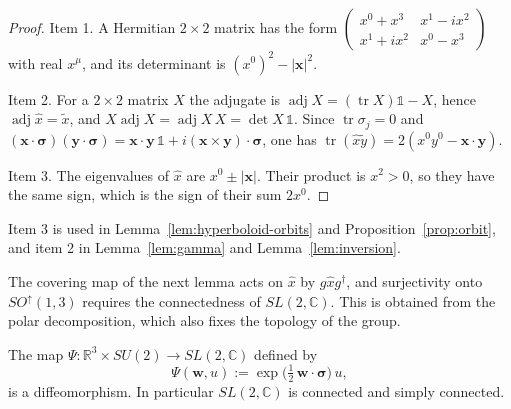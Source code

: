 \begin{proof}
	Item 1. A Hermitian $2\times2$ matrix has the form $\begin{pmatrix}x^0+x^3&x^1-ix^2\\x^1+ix^2&x^0-x^3\end{pmatrix}$ with real $x^\mu$, and its determinant is $(x^0)^2-|\mathbf{x}|^2$.
	
	Item 2. For a $2\times2$ matrix $X$ the adjugate is $\operatorname{adj}X=(\operatorname{tr}X)\mathbb{1}-X$, hence $\operatorname{adj}\hat{x}=\tilde{x}$, and $X\operatorname{adj}X=\operatorname{adj}X\,X=\det X\,\mathbb{1}$. Since $\operatorname{tr}\sigma_j=0$ and $(\mathbf{x}\cdot\boldsymbol{\sigma})(\mathbf{y}\cdot\boldsymbol{\sigma})=\mathbf{x}\cdot\mathbf{y}\,\mathbb{1}+i(\mathbf{x}\times\mathbf{y})\cdot\boldsymbol{\sigma}$, one has $\operatorname{tr}(\hat{x}\tilde{y})=2(x^0y^0-\mathbf{x}\cdot\mathbf{y})$.
	
	Item 3. The eigenvalues of $\hat{x}$ are $x^0\pm|\mathbf{x}|$. Their product is $x^2>0$, so they have the same sign, which is the sign of their sum $2x^0$.
\end{proof}

\noindent Item 3 is used in Lemma~\ref{lem:hyperboloid-orbits} and Proposition~\ref{prop:orbit}, and item 2 in Lemma~\ref{lem:gamma} and Lemma~\ref{lem:inversion}.

The covering map of the next lemma acts on $\hat{x}$ by $g\hat{x}g^\dagger$, and surjectivity onto $SO^\uparrow(1,3)$ requires the connectedness of $SL(2,\mathbb{C})$. This is obtained from the polar decomposition, which also fixes the topology of the group.

\begin{lemma}\label{lem:polar}
	The map $\Psi:\mathbb{R}^3\times SU(2)\to SL(2,\mathbb{C})$ defined by
	\begin{equation}
		\Psi(\mathbf{w},u):=\exp\!\big(\tfrac12\,\mathbf{w}\cdot\boldsymbol{\sigma}\big)\,u,
	\end{equation}
	is a diffeomorphism. In particular $SL(2,\mathbb{C})$ is connected and simply connected.
\end{lemma}

